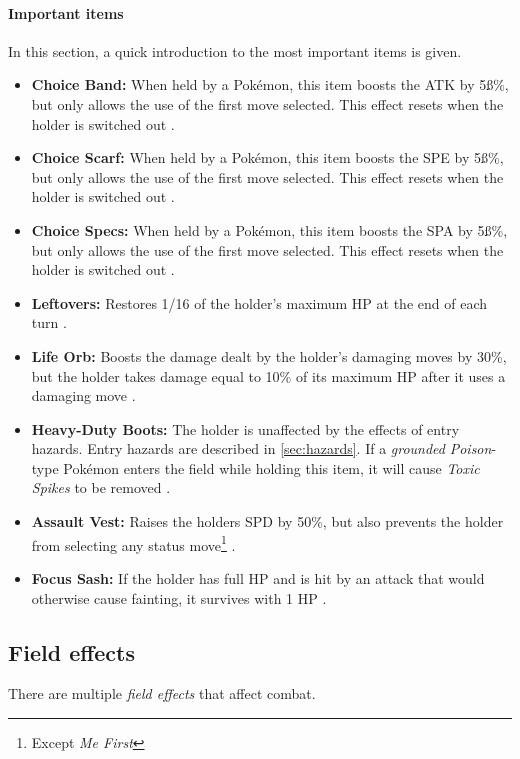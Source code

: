 \paragraph{Important items}
\label{sec:Important-items}
In this section, a quick introduction to the most important items is given.
\begin{itemize}
	\item \textbf{Choice Band:} When held by a Pokémon, this item boosts the \ac{ATK} by 5ß\%, but only
	allows the use of the first move selected. This effect resets when the holder is switched out \cite{Bulbapedia:ChoiceBand}. 
	\item \textbf{Choice Scarf:} When held by a Pokémon, this item boosts the \ac{SPE} by 5ß\%, but only
	allows the use of the first move selected. This effect resets when the holder is switched out \cite{Bulbapedia:ChoiceScarf}. 
	\item \textbf{Choice Specs:} When held by a Pokémon, this item boosts the \ac{SPA} by 5ß\%, but only
	allows the use of the first move selected. This effect resets when the holder is switched out \cite{Bulbapedia:ChoiceSpecs}. 
	\item \textbf{Leftovers:} Restores 1/16 of the holder's maximum \ac{HP} at the end of each turn \cite{Bulbapedia:Leftovers}.
	\item \textbf{Life Orb:} Boosts the damage dealt by the holder's damaging moves by 30\%, but the holder takes damage 
	equal to 10\% of its maximum \ac{HP} after it uses a damaging move \cite{Bulbapedia:LifeOrb}.
	\item \textbf{Heavy-Duty Boots:} The holder is unaffected by the effects of entry hazards. Entry hazards are described 
	in \ref{sec:hazards}. If a \textit{grounded} \textit{Poison}-type Pokémon enters the field while holding this item,
	it will cause \textit{Toxic Spikes} to be removed \cite{Bulbapedia:HeavyDutyBoots}.
	\item \textbf{Assault Vest:} Raises the holders \ac{SPD} by 50\%, but also prevents the holder from selecting any 
	status move\footnote{Except \textit{Me First}} \cite{Bulbapedia:AssaultVest}.
	\item \textbf{Focus Sash:} If the holder has full \ac{HP} and is hit by an attack that would otherwise cause fainting,
	it survives with 1 HP \cite{Bulbapedia:FocusSash}.
\end{itemize}

\subsection{Field effects}
There are multiple \textit{field effects} that affect combat.
